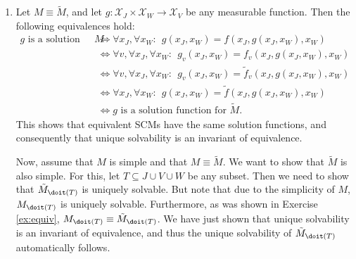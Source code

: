 \begin{enumerate}
\begin{gradedsolution}
\begin{enumerate}
	Then, for $v \in V \setminus T$ and arbitrary $x \in \mathcal{X}$ we obtain:
	\begin{align*}
		x_v = f'_v(x) & \Longleftrightarrow x_v = f_v(x) \\
		& \Longleftrightarrow x_v = \tilde{f}_v(x) \\
		& \Longleftrightarrow x_v = \tilde{f}'_v(x).
	\end{align*}
	Thereby, in the first step we used the definition of $f'$ and that $v \in V \setminus T$. 
	In the second step, we used the equivalence $M \equiv \tilde{M}$.
	In the last step, we used the definition of $\tilde{f}'$ and again that $v \in V \setminus T$.

	Finally, for $v \in T$ and arbitrary $x \in X$, we obtain:
	\begin{align*}
		x_v = f'_v(x) & \Longleftrightarrow x_v = \xi_v \\
		& \Longleftrightarrow x_v = \tilde{f}'_v(x).
	\end{align*}
	Since $V \cup T = (V \setminus T) \cup T$, this proves the claim.
	\item Let $M \equiv \tilde{M}$, and let $g: \mathcal{X}_J \times \mathcal{X}_W \to \mathcal{X}_V$ be any measurable function.
	Then the following equivalences hold:
	\begin{align*}
		g \text{ is a solution function for } M & \Longleftrightarrow \forall x_J, \forall x_W: \ \ g(x_J, x_W) = f(x_J, g(x_J, x_W), x_W) \\
		&   \Longleftrightarrow \forall v, \forall x_J, \forall x_W: \ \ g_v(x_J, x_W) = f_v(x_J, g(x_J, x_W), x_W) \\
		&  \Longleftrightarrow   \forall v, \forall x_J, \forall x_W: \ \ g_v(x_J, x_W) = \tilde{f}_v(x_J, g(x_J, x_W), x_W) \\
		& \Longleftrightarrow   \forall x_J, \forall x_W: \ \ g(x_J, x_W) = \tilde{f}(x_J, g(x_J, x_W), x_W) \\
		& \Longleftrightarrow g \text{ is a solution function for } \tilde{M}.
	\end{align*}
	This shows that equivalent SCMs have the same solution functions, and consequently that unique solvability is an invariant of equivalence.

	Now, assume that $M$ is simple and that $M \equiv \tilde{M}$.
	We want to show that $\tilde{M}$ is also simple.
	For this, let $T \subseteq J \cup V \cup W$ be any subset.
	Then we need to show that $\tilde{M}_{\doit(T)}$ is uniquely solvable.
	But note that due to the simplicity of $M$, $M_{\doit(T)}$ is uniquely solvable. 
	Furthermore, as was shown in Exercise \ref{ex:equiv}, $M_{\doit(T)} \equiv \tilde{M}_{\doit(T)}$. We have just shown that unique solvability is an invariant of equivalence, and thus the unique solvability of $\tilde{M}_{\doit(T)}$ automatically follows.


\end{enumerate}
\end{gradedsolution}
\end{enumerate}
